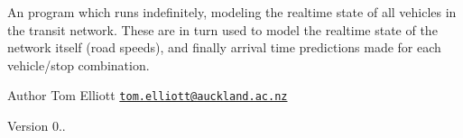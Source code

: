 An program which runs indefinitely, modeling the realtime state of all vehicles in the transit network. These are in turn used to model the realtime state of the network itself (road speeds), and finally arrival time predictions made for each vehicle/stop combination.

\begin{DoxyAuthor}{Author}
Tom Elliott \href{mailto:tom.elliott@auckland.ac.nz}{\tt tom.\+elliott@auckland.\+ac.\+nz} 
\end{DoxyAuthor}
\begin{DoxyVersion}{Version}
0.. 
\end{DoxyVersion}
